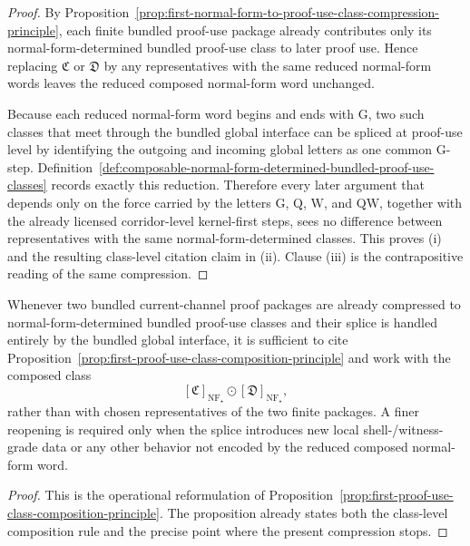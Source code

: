 \begin{proof}
By Proposition~\ref{prop:first-normal-form-to-proof-use-class-compression-principle}, each finite bundled proof-use package already contributes only its normal-form-determined bundled proof-use class to later proof use. Hence replacing \(\mathfrak C\) or \(\mathfrak D\) by any representatives with the same reduced normal-form words leaves the reduced composed normal-form word unchanged.

Because each reduced normal-form word begins and ends with \(\mathrm G\), two such classes that meet through the bundled global interface can be spliced at proof-use level by identifying the outgoing and incoming global letters as one common \(\mathrm G\)-step. Definition~\ref{def:composable-normal-form-determined-bundled-proof-use-classes} records exactly this reduction. Therefore every later argument that depends only on the force carried by the letters \(\mathrm G\), \(\mathrm Q\), \(\mathrm W\), and \(\mathrm{QW}\), together with the already licensed corridor-level kernel-first steps, sees no difference between representatives with the same normal-form-determined classes. This proves (i) and the resulting class-level citation claim in (ii). Clause (iii) is the contrapositive reading of the same compression.
\end{proof}

\begin{corollary}
\label{cor:use-rule-for-the-first-proof-use-class-composition-principle}
Whenever two bundled current-channel proof packages are already compressed to normal-form-determined bundled proof-use classes and their splice is handled entirely by the bundled global interface, it is sufficient to cite Proposition~\ref{prop:first-proof-use-class-composition-principle} and work with the composed class
\[
[\mathfrak C]_{\operatorname{NF}_{\star}}\odot[\mathfrak D]_{\operatorname{NF}_{\star}},
\]
rather than with chosen representatives of the two finite packages. A finer reopening is required only when the splice introduces new local shell-/witness-grade data or any other behavior not encoded by the reduced composed normal-form word.
\end{corollary}

\begin{proof}
This is the operational reformulation of Proposition~\ref{prop:first-proof-use-class-composition-principle}. The proposition already states both the class-level composition rule and the precise point where the present compression stops.
\end{proof}


